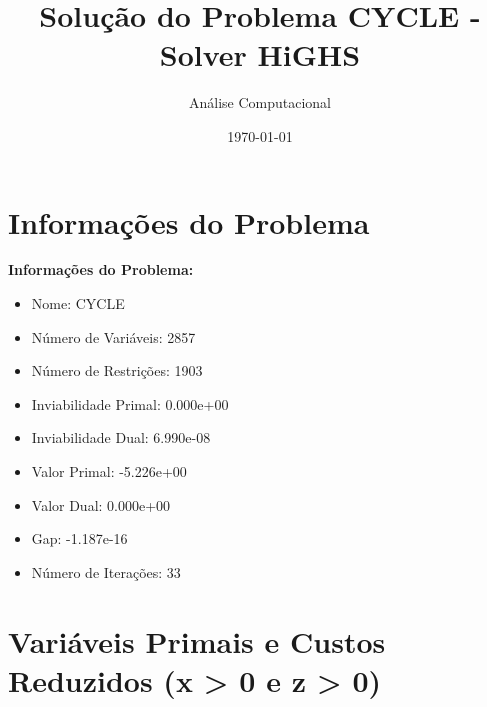 \documentclass[12pt]{article}
\title{Solução do Problema CYCLE - Solver HiGHS}
\author{Análise Computacional}
\date{\today}
\begin{document}
\maketitle

\section{Informações do Problema}

\textbf{Informações do Problema:}
\begin{itemize}
\item Nome: CYCLE
\item Número de Variáveis: 2857
\item Número de Restrições: 1903
\item Inviabilidade Primal: 0.000e+00
\item Inviabilidade Dual: 6.990e-08
\item Valor Primal: -5.226e+00
\item Valor Dual: 0.000e+00
\item Gap: -1.187e-16
\item Número de Iterações: 33
\end{itemize}


\section{Variáveis Primais e Custos Reduzidos (x > 0 e z > 0)}
\end{document}
